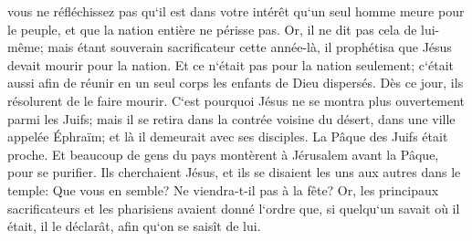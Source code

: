 \verse vous ne réfléchissez pas qu`il est dans votre intérêt qu`un seul homme meure pour le peuple, et que la nation entière ne périsse pas. 
\verse Or, il ne dit pas cela de lui-même; mais étant souverain sacrificateur cette année-là, il prophétisa que Jésus devait mourir pour la nation. 
\verse Et ce n`était pas pour la nation seulement; c`était aussi afin de réunir en un seul corps les enfants de Dieu dispersés. 
\verse Dès ce jour, ils résolurent de le faire mourir. 
\verse C`est pourquoi Jésus ne se montra plus ouvertement parmi les Juifs; mais il se retira dans la contrée voisine du désert, dans une ville appelée Éphraïm; et là il demeurait avec ses disciples. 
\verse La Pâque des Juifs était proche. Et beaucoup de gens du pays montèrent à Jérusalem avant la Pâque, pour se purifier. 
\verse Ils cherchaient Jésus, et ils se disaient les uns aux autres dans le temple: Que vous en semble? Ne viendra-t-il pas à la fête? 
\verse Or, les principaux sacrificateurs et les pharisiens avaient donné l`ordre que, si quelqu`un savait où il était, il le déclarât, afin qu`on se saisît de lui. 

\chapter{}

